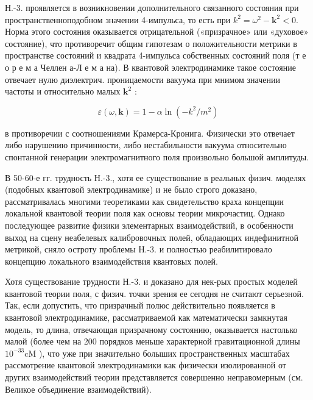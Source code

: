 \documentclass[10pt]{article}
\begin{document}
Н.-3. проявляется в возникновении дополнительного связанного состояния при пространственноподобном значении 4-импульса, то есть при $k^{2}=\omega^{2}-\boldsymbol{k}^{2}<0$. Норма этого состояния оказывается отрицательной («призрачное» или «духовое» состояние), что противоречит общим гипотезам о положительности метрики в пространстве состояний и квадрата 4-импульса собственных состояний поля (т е о р е м а Челлен а-Л е м а на). В квантовой электродинамике такое состояние отвечает нулю диэлектрич. проницаемости вакуума при мнимом значении частоты и относительно малых $\boldsymbol{k}^{2}$ :



\[

\varepsilon(\omega, \boldsymbol{k})=1-\alpha \ln \left(-k^{2} / m^{2}\right)

\]



в противоречии с соотношениями Крамерса-Кронига. Физически это отвечает либо нарушению причинности, либо нестабильности вакуума относительно спонтанной генерации электромагнитного поля произвольно большой амплитуды.



В 50-60-е гг. трудность Н.-3., хотя ее существование в реальных физич. моделях (подобных квантовой электродинамике) и не было строго доказано, рассматривалась многими теоретиками как свидетельство краха концепции локальной квантовой теории поля как основы теории микрочастиц. Однако последующее развитие физики элементарных взаимодействий, в особенности выход на сцену неабелевых калибровочных полей, обладающих индефинитной метрикой, сняло остроту проблемы Н.-3. и полностью реабилитировало концепцию локального взаимодействия квантовых полей.



Хотя существование трудности Н.-3. и доказано для нек-рых простых моделей квантовой теории поля, с физич. точки зрения ее сегодня не считают серьезной. Так, если допустить, что призрачный полюс действительно появляется в квантовой электродинамике, рассматриваемой как математически замкнутая модель, то длина, отвечающая призрачному состоянию, оказывается настолько малой (более чем на 200 порядков меньше характерной гравитационной длины $10^{-33} \mathrm{cM}$ ), что уже при значительно болыших пространственных масштабах рассмотрение квантовой электродинамики как физически изолированной от других взаимодействий теории представляется совершенно неправомерным (см. Великое объединение взаимодействий).
\end{document}
